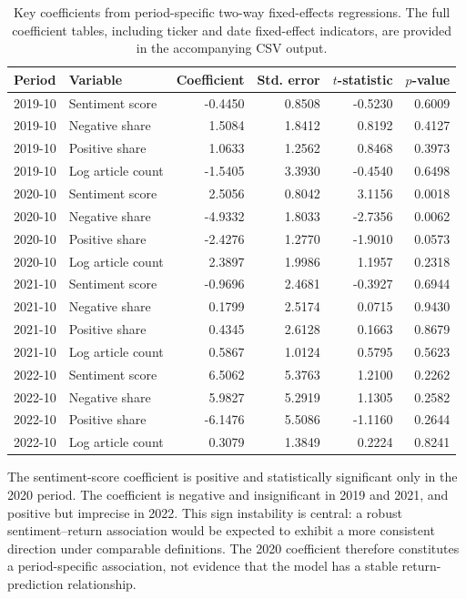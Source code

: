 \begin{table}[htbp]
\centering
\scriptsize
\caption{Key coefficients from period-specific two-way fixed-effects regressions. The full coefficient tables, including ticker and date fixed-effect indicators, are provided in the accompanying CSV output.}
\label{tab:panel-key-coefficients-multi-year}
\begin{tabular}{llrrrr}
\toprule
\textbf{Period} & \textbf{Variable} & \textbf{Coefficient} & \textbf{Std. error} & \textbf{$t$-statistic} & \textbf{$p$-value} \\
\midrule
2019-10 & Sentiment score & -0.4450 & 0.8508 & -0.5230 & 0.6009 \\
2019-10 & Negative share & 1.5084 & 1.8412 & 0.8192 & 0.4127 \\
2019-10 & Positive share & 1.0633 & 1.2562 & 0.8468 & 0.3973 \\
2019-10 & Log article count & -1.5405 & 3.3930 & -0.4540 & 0.6498 \\
2020-10 & Sentiment score & 2.5056 & 0.8042 & 3.1156 & 0.0018 \\
2020-10 & Negative share & -4.9332 & 1.8033 & -2.7356 & 0.0062 \\
2020-10 & Positive share & -2.4276 & 1.2770 & -1.9010 & 0.0573 \\
2020-10 & Log article count & 2.3897 & 1.9986 & 1.1957 & 0.2318 \\
2021-10 & Sentiment score & -0.9696 & 2.4681 & -0.3927 & 0.6944 \\
2021-10 & Negative share & 0.1799 & 2.5174 & 0.0715 & 0.9430 \\
2021-10 & Positive share & 0.4345 & 2.6128 & 0.1663 & 0.8679 \\
2021-10 & Log article count & 0.5867 & 1.0124 & 0.5795 & 0.5623 \\
2022-10 & Sentiment score & 6.5062 & 5.3763 & 1.2100 & 0.2262 \\
2022-10 & Negative share & 5.9827 & 5.2919 & 1.1305 & 0.2582 \\
2022-10 & Positive share & -6.1476 & 5.5086 & -1.1160 & 0.2644 \\
2022-10 & Log article count & 0.3079 & 1.3849 & 0.2224 & 0.8241 \\
\bottomrule
\end{tabular}
\end{table}

The sentiment-score coefficient is positive and statistically significant only in the 2020 period. The coefficient is negative and insignificant in 2019 and 2021, and positive but imprecise in 2022. This sign instability is central: a robust sentiment--return association would be expected to exhibit a more consistent direction under comparable definitions. The 2020 coefficient therefore constitutes a period-specific association, not evidence that the model has a stable return-prediction relationship.

